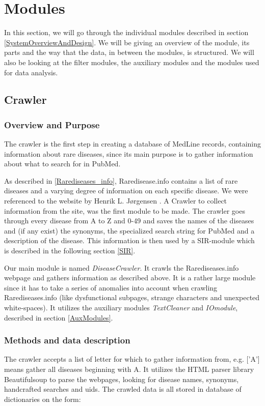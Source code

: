 \section{Modules}

In this section, we will go through the individual modules described
in section \ref{SystemOverviewAndDesign}. We will be giving an
overview of the module, its parts and the way that the data, in
between the modules, is structured. We will also be looking at the
filter modules, the auxiliary modules and the modules used for data
analysis.

\subsection{Crawler\label{Crawler}}

\subsubsection{Overview and Purpose}
The crawler is the first step in creating a database of MedLine
records, containing information about rare diseases, since its main
purpose is to gather information about what to search for in PubMed.

As described in \ref{Rarediseases_info}, Raredisease.info contains a
list of rare diseases and a varying degree of information on each
specific disease. We were referenced to the website by Henrik L.
J\o rgensen \cite{TheDude}. A Crawler to collect information from the
site, was the first module to be made. The crawler goes through every
disease from A to Z and 0-49 and saves the names of the diseases and
(if any exist) the synonyms, the specialized search string for PubMed
and a description of the disease. This information is then used by a
SIR-module which is described in the following section \ref{SIR}.

Our main module is named \textit{DiseaseCrawler}. It crawls the
Rarediseases.info webpage and gathers information as described
above. It is a rather large module since it has to take a series of
anomalies into account when crawling Rarediseases.info (like
dysfunctional subpages, strange characters and unexpected
white-spaces). It utilizes the auxiliary modules \textit{TextCleaner}
and \textit{IOmodule}, described in section \ref{AuxModules}.


\subsubsection{Methods and data description}
The crawler accepts a list of letter for which to gather information
from, e.g. ['A'] means gather all diseases beginning with A. It
utilizes the HTML parser library Beautifulsoup \cite{BS} to parse the
webpages, looking for disease names, synonyms, handcrafted searches
and uids. The crawled data is all stored in database of dictionaries
on the form:

